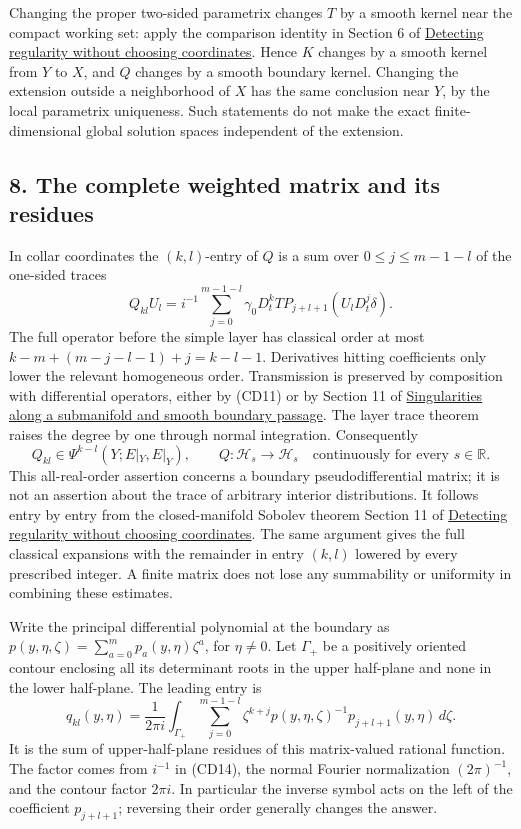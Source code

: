 \documentclass[
  11pt,
]{article}
\begin{document}
Changing the proper two-sided parametrix changes \(T\) by a smooth
kernel near the compact working set: apply the comparison identity in
Section 6 of \href{geometric-microlocal-calculus.pdf}{Detecting
regularity without choosing coordinates}. Hence \(K\) changes by a
smooth kernel from \(Y\) to \(X\), and \(Q\) changes by a smooth
boundary kernel. Changing the extension outside a neighborhood of \(X\)
has the same conclusion near \(Y\), by the local parametrix uniqueness.
Such statements do not make the exact finite-dimensional global solution
spaces independent of the extension.

\subsection{8. The complete weighted matrix and its
residues}\label{the-complete-weighted-matrix-and-its-residues}

In collar coordinates the \((k,l)\)-entry of \(Q\) is a sum over
\(0\leq j\leq m-1-l\) of the one-sided traces \[
Q_{kl}U_l=i^{-1}\sum_{j=0}^{m-1-l}
\gamma_0D_t^kT P_{j+l+1}(U_lD_t^j\delta).
\tag{CD20}
\] The full operator before the simple layer has classical order at most
\(k-m+(m-j-l-1)+j=k-l-1\). Derivatives hitting coefficients only lower
the relevant homogeneous order. Transmission is preserved by composition
with differential operators, either by (CD11) or by Section 11 of
\href{conormal-transmission.pdf}{Singularities along a submanifold and
smooth boundary passage}. The layer trace theorem raises the degree by
one through normal integration. Consequently \[
Q_{kl}\in\Psi^{k-l}(Y;E|_Y,E|_Y),\qquad
Q:\mathcal H_s\longrightarrow\mathcal H_s
\quad\text{continuously for every }s\in\mathbb R.
\tag{CD21}
\] This all-real-order assertion concerns a boundary pseudodifferential
matrix; it is not an assertion about the trace of arbitrary interior
distributions. It follows entry by entry from the closed-manifold
Sobolev theorem Section 11 of
\href{geometric-microlocal-calculus.pdf}{Detecting regularity without
choosing coordinates}. The same argument gives the full classical
expansions with the remainder in entry \((k,l)\) lowered by every
prescribed integer. A finite matrix does not lose any summability or
uniformity in combining these estimates.

Write the principal differential polynomial at the boundary as
\(p(y,\eta,\zeta)=\sum_{a=0}^mp_a(y,\eta)\zeta^a\), for \(\eta\ne0\).
Let \(\Gamma_+\) be a positively oriented contour enclosing all its
determinant roots in the upper half-plane and none in the lower
half-plane. The leading entry is \[
q_{kl}(y,\eta)=\frac1{2\pi i}\int_{\Gamma_+}
\sum_{j=0}^{m-1-l}\zeta^{k+j}
p(y,\eta,\zeta)^{-1}p_{j+l+1}(y,\eta)\,d\zeta.
\tag{CD22}
\] It is the sum of upper-half-plane residues of this matrix-valued
rational function. The factor comes from \(i^{-1}\) in (CD14), the
normal Fourier normalization \((2\pi)^{-1}\), and the contour factor
\(2\pi i\). In particular the inverse symbol acts on the left of the
coefficient \(p_{j+l+1}\); reversing their order generally changes the
answer.
\end{document}
